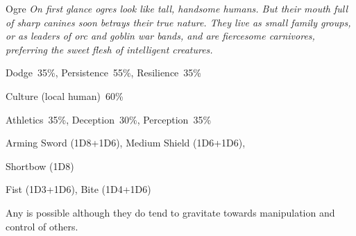 \begin{monsterbox}{Ogre}
	\textit{On first glance ogres look like tall, handsome humans. But their mouth full of sharp canines soon betrays their true nature. They live as small family groups, or as leaders of orc and goblin war bands, and are fiercesome carnivores, preferring the sweet flesh of intelligent creatures.}\\
	\rpghline
	\basics[%
        hitpoints  = 13, %
	majorwound = 7,
	damagemodifier = +1D6,
	powerpoints = 13,
	movementrate = 15m,
	armor = Leather (2AP),
	plunderrating = 3
	]
	\rpghline%
	\stats[ %
		STR = 2D6+12 (19),
		CON = 2D6+6  (13),
		DEX = 3D6    (11),
		SIZ = 2D6+6  (13),
		INT = 2D6+6  (13),
		POW = 2D6+6  (13),
		CHA = 3D6+3  (14)
	]
	\rpghline%
	\begin{rpg-monsteraction}[Resistances]
		Dodge~35\%, Persistence~55\%, Resilience~35\%
	\end{rpg-monsteraction}
	\begin{rpg-monsteraction}[Knowledge]
		Culture (local human)~60\%
	\end{rpg-monsteraction}
	\begin{rpg-monsteraction}[Practical]
		Athletics~35\%, Deception~30\%, Perception~35\%
	\end{rpg-monsteraction}
	\begin{rpg-monsteraction}
		Arming Sword (1D8+1D6), Medium Shield (1D6+1D6), 
	\end{rpg-monsteraction}
	\begin{rpg-monsteraction}
		Shortbow (1D8)
	\end{rpg-monsteraction}
	\begin{rpg-monsteraction}
		Fist (1D3+1D6), Bite (1D4+1D6)
	\end{rpg-monsteraction}
	\begin{rpg-monsteraction}[Supernatural]
		Any is possible although they do tend to gravitate towards manipulation and control of others.
	\end{rpg-monsteraction}

\end{monsterbox}

\newpage

